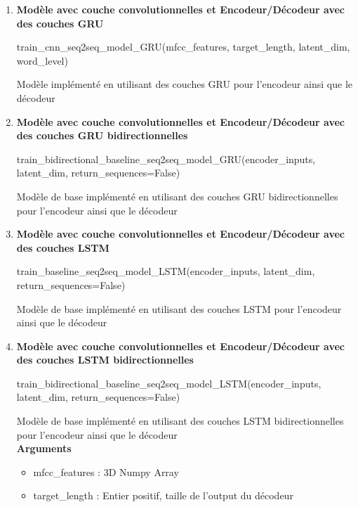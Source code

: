    \begin{enumerate}
        \item \textbf{Modèle avec couche convolutionnelles et Encodeur/Décodeur avec des couches GRU}  
            \begin{tcolorbox}
                train\_cnn\_seq2seq\_model\_GRU(mfcc\_features, target\_length, latent\_dim, word\_level)
            \end{tcolorbox}
            Modèle implémenté en utilisant des couches GRU pour l'encodeur ainsi que le décodeur \\
        \item \textbf{Modèle avec couche convolutionnelles et Encodeur/Décodeur avec des couches GRU bidirectionnelles} 
            \begin{tcolorbox}
            train\_bidirectional\_baseline\_seq2seq\_model\_GRU(encoder\_inputs, latent\_dim, return\_sequences=False)
            \end{tcolorbox}
            Modèle de base implémenté en utilisant des couches GRU bidirectionnelles pour l'encodeur ainsi que le décodeur \\
        \item \textbf{Modèle avec couche convolutionnelles et Encodeur/Décodeur avec des couches LSTM} 
            \begin{tcolorbox}
            train\_baseline\_seq2seq\_model\_LSTM(encoder\_inputs, latent\_dim, return\_sequences=False)
            \end{tcolorbox}
            Modèle de base implémenté en utilisant des couches LSTM pour l'encodeur ainsi que le décodeur \\
        \item \textbf{Modèle avec couche convolutionnelles et Encodeur/Décodeur avec des couches LSTM  bidirectionnelles}
            \begin{tcolorbox}
            train\_bidirectional\_baseline\_seq2seq\_model\_LSTM(encoder\_inputs, latent\_dim, return\_sequences=False)
            \end{tcolorbox}
            Modèle de base implémenté en utilisant des couches LSTM bidirectionnelles pour l'encodeur ainsi que le décodeur \\
            \textbf{Arguments} 
            \begin{itemize}
                \item mfcc\_features : 3D Numpy Array
                \item target\_length : Entier positif, taille de l'output du décodeur

\end{itemize}
\end{enumerate}
